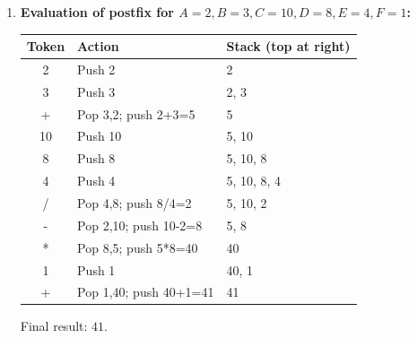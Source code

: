 \documentclass[11pt]{article}
\begin{document}
\begin{corrige}
\begin{enumerate}
\item \textbf{Evaluation of postfix for $A=2, B=3, C=10, D=8, E=4, F=1$:}
\begin{center}
\begin{tabularx}{\linewidth}{|c|X|X|}\hline
\rowcolor{popblueL}
\textbf{Token} & \textbf{Action} & \textbf{Stack (top at right)} \\ \hline
2 & Push 2 & 2 \\ \hline
3 & Push 3 & 2, 3 \\ \hline
+ & Pop 3,2; push 2+3=5 & 5 \\ \hline
10 & Push 10 & 5, 10 \\ \hline
8 & Push 8 & 5, 10, 8 \\ \hline
4 & Push 4 & 5, 10, 8, 4 \\ \hline
/ & Pop 4,8; push 8/4=2 & 5, 10, 2 \\ \hline
- & Pop 2,10; push 10-2=8 & 5, 8 \\ \hline
* & Pop 8,5; push 5*8=40 & 40 \\ \hline
1 & Push 1 & 40, 1 \\ \hline
+ & Pop 1,40; push 40+1=41 & 41 \\ \hline
\end{tabularx}
\end{center}
Final result: $41$.
\end{enumerate}
\end{corrige}
\end{document}
